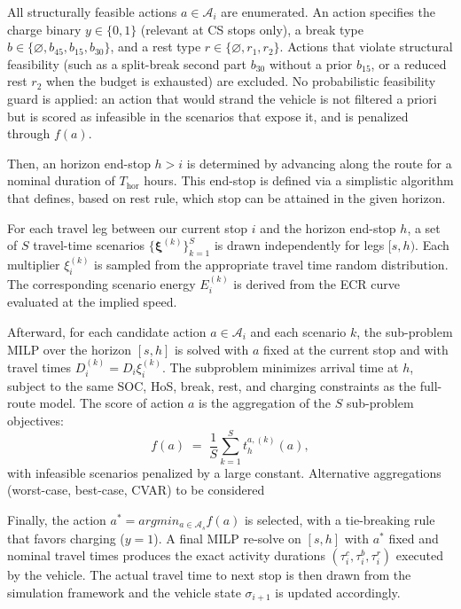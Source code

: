 \documentclass[preprint,12pt,3p]{elsarticle}
\begin{document}
All structurally feasible actions $a \in \mathcal{A}_i$ are enumerated. An action specifies the charge binary $y \in \{0,1\}$ (relevant at CS stops only), a break type $b \in \{\varnothing, b_{45}, b_{15}, b_{30}\}$, and a rest type $r \in \{\varnothing, r_1, r_2\}$. Actions that violate structural feasibility (such as a split-break second part $b_{30}$ without a prior $b_{15}$, or a reduced rest $r_2$ when the budget is exhausted) are excluded. %
No probabilistic feasibility guard is applied: an action that would strand the vehicle is not filtered a priori but is scored as infeasible in the scenarios that expose it, and is penalized through $f(a)$.

Then, an horizon end-stop $h > i$ is determined by advancing along the route for a nominal duration of $T_{\mathrm{hor}}$ hours. This end-stop is defined via a simplistic algorithm that defines, based on rest rule, which stop can be attained in the given horizon.

For each travel leg between our current stop $i$ and the horizon end-stop $h$, a set of $S$ travel-time scenarios $\{ \boldsymbol{\xi}^{(k)}\}_{k=1}^{S}$ is drawn independently for legs $[s, h)$. Each multiplier $\xi^{(k)}_i$ is sampled from the appropriate travel time random distribution. The corresponding scenario energy $E^{(k)}_i$ is derived from the ECR curve evaluated at the implied speed.

Afterward, for each candidate action $a \in \mathcal{A}_i$ and each scenario $k$, the sub-problem MILP over the horizon $[s, h]$ is solved with $a$ fixed at the current stop and with travel times $D^{(k)}_i = D_i \xi^{(k)}_i$. The subproblem minimizes arrival time at $h$, subject to the same SOC, HoS, break, rest, and charging constraints as the full-route model. The score of action $a$ is the aggregation of the $S$ sub-problem objectives:
\[
  f(a) \;=\; \frac{1}{S}\sum_{k=1}^{S} t^{a,(k)}_h(a),
\]
with infeasible scenarios penalized by a large constant. {\color{red} Alternative aggregations (worst-case, best-case, CVAR) to be considered }

Finally, the action $a^* = argmin_ {a \in \mathcal{A}_s} f(a)$ is selected, with a tie-breaking rule that favors charging ($y=1$). A final MILP re-solve on $[s, h]$ with $a^*$ fixed and nominal travel times produces the exact activity durations $(\tau^c_i, \tau^b_i, \tau^r_i)$ executed by the vehicle. The actual travel time to next stop is then drawn from the simulation framework and the vehicle state $\sigma_{i+1}$ is updated accordingly.
\end{document}
